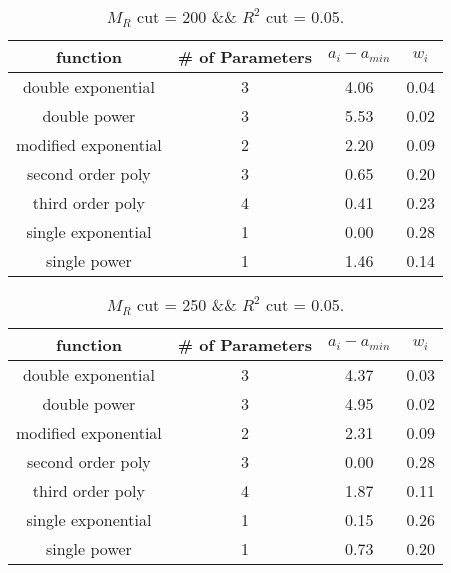  
\begin{table}[H] 
\begin{center} 
\begin{tabular}{|c|c|c|c|} 
\hline function & \# of Parameters & $a_i-a_{min}$ & $w_i$ \\ \hline 
double exponential &  3 &   4.06 &   0.04 \\ 
double power &  3 &   5.53 &   0.02 \\ 
modified exponential &  2 &   2.20 &   0.09 \\ 
second order poly &  3 &   0.65 &   0.20 \\ 
third order poly &  4 &   0.41 &   0.23 \\ 
single exponential &  1 &   0.00 &   0.28 \\ 
single power &  1 &   1.46 &   0.14 \\ 
\hline 
\end{tabular} 
\caption{$M_R$ cut = 200 \&\& $R^2$ cut = 0.05.} 
\label{tab:FitChoices_200_0.05} 
\end{center} 
\end{table} 
 
 
\begin{table}[H] 
\begin{center} 
\begin{tabular}{|c|c|c|c|} 
\hline function & \# of Parameters & $a_i-a_{min}$ & $w_i$ \\ \hline 
double exponential &  3 &   4.37 &   0.03 \\ 
double power &  3 &   4.95 &   0.02 \\ 
modified exponential &  2 &   2.31 &   0.09 \\ 
second order poly &  3 &   0.00 &   0.28 \\ 
third order poly &  4 &   1.87 &   0.11 \\ 
single exponential &  1 &   0.15 &   0.26 \\ 
single power &  1 &   0.73 &   0.20 \\ 
\hline 
\end{tabular} 
\caption{$M_R$ cut = 250 \&\& $R^2$ cut = 0.05.} 
\label{tab:FitChoices_250_0.05} 
\end{center} 
\end{table} 
 
